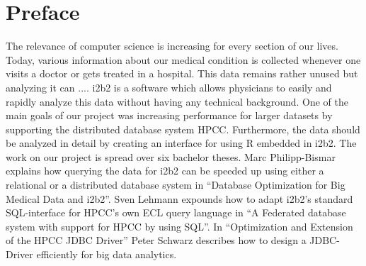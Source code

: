 \section*{Preface}

The relevance of computer science is increasing for every section of our lives. Today, various information about our medical condition is collected whenever one visits a doctor or gets treated in a hospital. This data remains rather unused but analyzing it can ....
i2b2 is a software which allows physicians to easily and rapidly analyze this data without having any technical background. One of the main goals of our project was increasing performance for larger datasets by supporting the distributed database system HPCC. Furthermore, the data should be analyzed in detail by creating an interface for using R embedded in i2b2.
The work on our project is spread over six bachelor theses. Marc Philipp-Bismar explains how querying the data for i2b2 can be speeded up using either a relational or a distributed database system in “Database Optimization for Big Medical Data and i2b2”. Sven Lehmann expounds how to adapt i2b2’s standard SQL-interface for HPCC’s own ECL query language in “A Federated database system with support for HPCC by using SQL”. In “Optimization and Extension of the HPCC JDBC Driver” Peter Schwarz describes how to design a JDBC-Driver efficiently for big data analytics.
